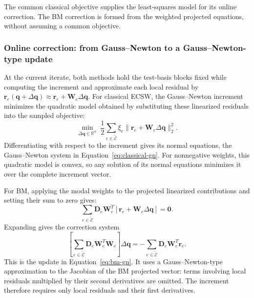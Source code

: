 \documentclass[a4paper,12pt]{article}
\newcommand{\vect}[1]{\boldsymbol{#1}}
\newcommand{\matr}[1]{\boldsymbol{#1}}
\begin{document}
The common classical objective supplies the least-squares model for its online correction. The BM correction is formed from the weighted projected equations, without assuming a common objective.

\subsubsection{Online correction: from Gauss--Newton to a Gauss--Newton-type update}
\label{sec:appendix-update-structure}

At the current iterate, both methods hold the test-basis blocks fixed while computing the increment and approximate each local residual by
$\vect{r}_e(\vect{q}+\Delta\vect{q})\approx\vect{r}_e+\matr{W}_e\Delta\vect{q}$.
For classical ECSW, the Gauss--Newton increment minimizes the quadratic model obtained by substituting these linearized residuals into the sampled objective:
\begin{equation}
 \underset{\Delta\vect{q}\in\mathbb R^n}{\min}\;
 \frac12\sum_{e\in\widetilde{\mathcal E}}\xi_e
    \|\vect{r}_e+\matr{W}_e\Delta\vect{q}\|_2^2.
 \label{eq:appendix-classical-increment-objective}
\end{equation}
Differentiating with respect to the increment gives its normal equations, the Gauss--Newton system in Equation~\eqref{eq:classical-gn}. For nonnegative weights, this quadratic model is convex, so any solution of its normal equations minimizes it over the complete increment vector.

For BM, applying the modal weights to the projected linearized contributions and setting their sum to zero gives:
\begin{equation}
 \sum_{e\in\widetilde{\mathcal E}}\matr{D}_e\matr{W}_e^T
       [\vect{r}_e+\matr{W}_e\Delta\vect{q}]=\vect{0}.
 \label{eq:appendix-bm-linearized-equations}
\end{equation}
Expanding gives the correction system
\begin{equation}
 \left[\sum_{e\in\widetilde{\mathcal E}}
          \matr{D}_e\matr{W}_e^T\matr{W}_e\right]\Delta\vect{q}
 =-\sum_{e\in\widetilde{\mathcal E}}
          \matr{D}_e\matr{W}_e^T\vect{r}_e.
 \label{eq:appendix-bm-correction-system}
\end{equation}
This is the update in Equation~\eqref{eq:bm-gn}. It uses a Gauss--Newton-type approximation to the Jacobian of the BM projected vector: terms involving local residuals multiplied by their second derivatives are omitted. The increment therefore requires only local residuals and their first derivatives.
\end{document}

